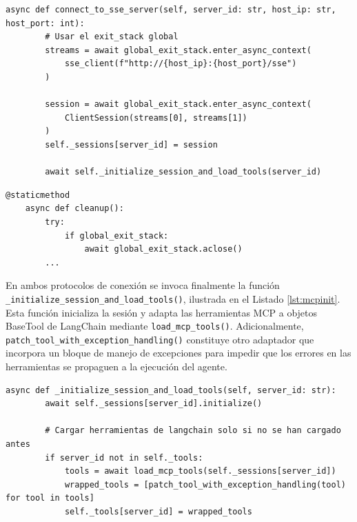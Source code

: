 \begin{lstlisting}[caption={mcp\_multi\_client.py: función \texttt{connect\_to\_sse\_server en cliente MCP}},label={lst:mcpsse}]
    async def connect_to_sse_server(self, server_id: str, host_ip: str, host_port: int):
        # Usar el exit_stack global
        streams = await global_exit_stack.enter_async_context(
            sse_client(f"http://{host_ip}:{host_port}/sse")
        )

        session = await global_exit_stack.enter_async_context(
            ClientSession(streams[0], streams[1])
        )
        self._sessions[server_id] = session

        await self._initialize_session_and_load_tools(server_id)
\end{lstlisting}

\begin{lstlisting}[caption={mcp\_multi\_client.py: función \texttt{cleanup()} en cliente MCP},label={lst:clean}]
    @staticmethod
    async def cleanup():
        try:
            if global_exit_stack:
                await global_exit_stack.aclose()
        ...

\end{lstlisting}


En ambos protocolos de conexión se invoca finalmente la función \texttt{\_initialize\_session\_and\_load\_tools()}, ilustrada en el Listado \ref{lst:mcpinit}. Esta función inicializa la sesión y adapta las herramientas MCP a objetos BaseTool de LangChain mediante \texttt{load\_mcp\_tools()}. Adicionalmente, \texttt{patch\_tool\_with\_exception\_handling()} constituye otro adaptador que incorpora un bloque de manejo de excepciones para impedir que los errores en las herramientas se propaguen a la ejecución del agente.

\begin{lstlisting}[caption={mcp\_multi\_client.py: función \texttt{\_initialize\_session\_and\_load\_tools en cliente MCP}},label={lst:mcpinit}]
    async def _initialize_session_and_load_tools(self, server_id: str):
        await self._sessions[server_id].initialize()

        # Cargar herramientas de langchain solo si no se han cargado antes
        if server_id not in self._tools:
            tools = await load_mcp_tools(self._sessions[server_id])
            wrapped_tools = [patch_tool_with_exception_handling(tool) for tool in tools]
            self._tools[server_id] = wrapped_tools
\end{lstlisting}





